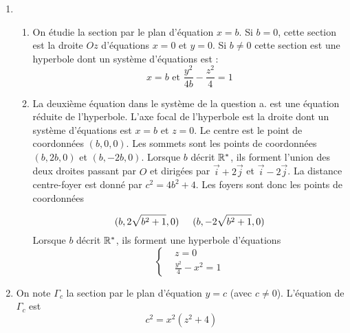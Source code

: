 \begin{enumerate}
 \item
\begin{enumerate}
 \item On étudie la section par le plan d'équation $x=b$.\newline
Si $b=0$, cette section est la droite $Oz$ d'équations $x=0$ et $y=0$.
Si $b\neq 0$ cette section est une hyperbole dont un système d'équations est :
\begin{displaymath}
 x=b \text{ et } \frac{y^2}{4b}-\frac{z^2}{4}=1
\end{displaymath}
 \item La deuxième équation dans le système de la question a. est une équation réduite de l'hyperbole. L'axe focal de l'hyperbole est la droite dont un système d'équations est $x=b$ et $z=0$. Le centre est le point de coordonnées $(b,0,0)$.\newline
Les sommets sont les points de coordonnées $(b,2b,0)$ et $(b,-2b,0)$.\newline
Lorsque $b$ décrit $\mathbb{R}^*$, ils forment l'union des deux droites passant par $O$ et dirigées par $\overrightarrow i + 2 \overrightarrow j$ et $\overrightarrow i - 2 \overrightarrow j$.\newline
La distance centre-foyer est donné par $c^2 = 4b^2+4$. Les foyers sont donc les points de coordonnées

\begin{displaymath}
 (b,2\sqrt{b^2+1},0)\hspace{0.5cm}(b,-2\sqrt{b^2+1},0)
\end{displaymath}
Lorsque $b$ décrit $\mathbb{R}^*$, ils forment une hyperbole d'équations 
\begin{displaymath}
 \left\lbrace 
\begin{aligned}
 &z=0\\
&\frac{y^2}{4}-x^2=1
\end{aligned}
\right.  
\end{displaymath}
\end{enumerate}
 
 \item On note $\Gamma_c$ la section par le plan d'équation $y=c$ (avec $c\neq0$). L'équation de $\Gamma_c$ est
\begin{displaymath}
 c^2 = x^2(z^2+4)
\end{displaymath}


\end{enumerate}
